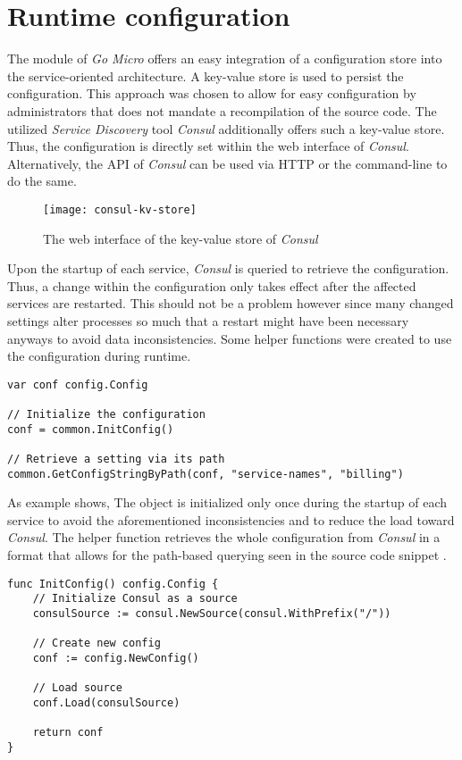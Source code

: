 \documentclass[12pt,a4paper,twoside]{report}
\begin{document}
\section{Runtime configuration}

The  module of \textit{Go Micro} offers an easy integration
of a configuration store into the service-oriented architecture.
A key-value store is used to persist the configuration.
This approach was chosen to allow for easy configuration by administrators
that does not mandate a recompilation of the source code.
The utilized \textit{Service Discovery} tool \textit{Consul} additionally offers
such a key-value store. Thus, the configuration is directly set within the
web interface of \textit{Consul}. Alternatively, the API of \textit{Consul}
can be used via HTTP or the command-line to do the same.
\begin{figure}[htbp]
\centering
\texttt{[image: consul-kv-store]}
\caption{The web interface of the key-value store of \textit{Consul}}
\label{fig:consul-kv-store}
\end{figure}
Upon the startup of each service, \textit{Consul} is queried to retrieve the
configuration. Thus, a change within the configuration only takes effect
after the affected services are restarted. This should not be a problem however
since many changed settings alter processes so much that a restart might
have been necessary anyways to avoid data inconsistencies.
Some helper functions were created to use the configuration during runtime.

\begin{lstlisting}[title=services/billing/main.go, float, floatplacement=H]
var conf config.Config

// Initialize the configuration
conf = common.InitConfig()

// Retrieve a setting via its path
common.GetConfigStringByPath(conf, "service-names", "billing")
\end{lstlisting}

As example  shows, The  object
is initialized only once during the startup of each service
to avoid the aforementioned inconsistencies and to reduce the load
toward \textit{Consul}. The helper function  retrieves
the whole configuration from \textit{Consul} in a format that allows for the
path-based querying seen in the source code snippet .

\begin{lstlisting}[title=common/config.go, float, floatplacement=H]
func InitConfig() config.Config {
	// Initialize Consul as a source
	consulSource := consul.NewSource(consul.WithPrefix("/"))

	// Create new config
	conf := config.NewConfig()

	// Load source
	conf.Load(consulSource)

	return conf
}
\end{lstlisting}
\end{document}
